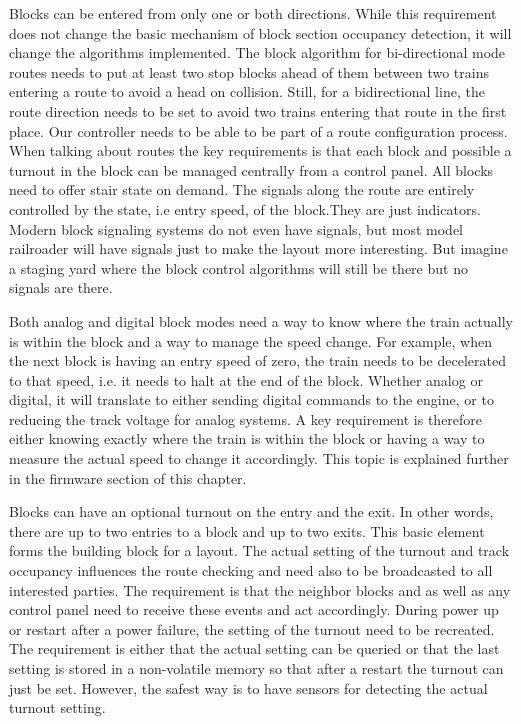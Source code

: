 Blocks can be entered from only one or both directions. While this requirement does not change the basic mechanism of block section occupancy detection, it will change the algorithms implemented. The block algorithm for bi-directional mode routes needs to put at least two stop blocks ahead of them between two trains entering a route to avoid a head on collision. Still, for a bidirectional line, the route direction needs to be set to avoid two trains entering that route in the first place. Our controller needs to be able to be part of a route configuration process. When talking about routes the key requirements is that each block and possible a turnout in the block can be managed centrally from a control panel. All blocks need to offer stair state on demand. The signals along the route are entirely controlled by the state, i.e entry speed, of the block.They are just indicators. Modern block signaling systems do not even have signals, but most model railroader will have signals just to make the layout more interesting. But imagine a staging yard where the block control algorithms will still be there but no signals are there.

Both analog and digital block modes need a way to know where the train actually is within the block and a way to manage the speed change. For example, when the next block is having an entry speed of zero, the train needs to be decelerated to that speed, i.e. it needs to halt at the end of the block. Whether analog or digital, it will translate to either sending digital commands to the engine, or to reducing the track voltage for analog systems. A key requirement is therefore either knowing exactly where the train is within the block or having a way to measure the actual speed to change it accordingly. This topic is explained further in the firmware section of this chapter.

Blocks can have an optional turnout on the entry and the exit. In other words, there are up to two entries to a block and up to two exits. This basic element forms the building block for a layout. The actual setting of the turnout and track occupancy influences the route checking and need also to be broadcasted to all interested parties. The requirement is that the neighbor blocks and as well as any control panel need to receive these events and act accordingly. During power up or restart after a power failure, the setting of the turnout need to be recreated. The requirement is either that the actual setting can be queried or that the last setting is stored in a non-volatile memory so that after a restart the turnout can just be set. However, the safest way is to have sensors for detecting the actual turnout setting.

